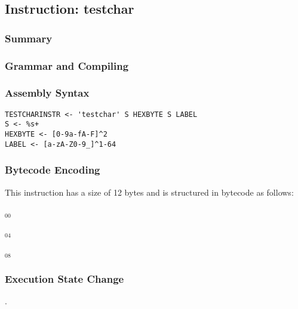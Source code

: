 \subsection{Instruction: testchar}

\subsubsection{Summary}


\subsubsection{Grammar and Compiling}


\subsubsection{Assembly Syntax}

\begin{myquote}
\begin{verbatim}
TESTCHARINSTR <- 'testchar' S HEXBYTE S LABEL
S <- %s+
HEXBYTE <- [0-9a-fA-F]^2
LABEL <- [a-zA-Z0-9_]^1-64
\end{verbatim}
\end{myquote}


\subsubsection{Bytecode Encoding}

This instruction has a size of 12 bytes and is structured in bytecode as follows:

$_{00}$\ 



$_{04}$\ 



$_{08}$\ 
\fbox{%
  \parbox{20pt}{%
00
  }%
}


\subsubsection{Execution State Change}

.


